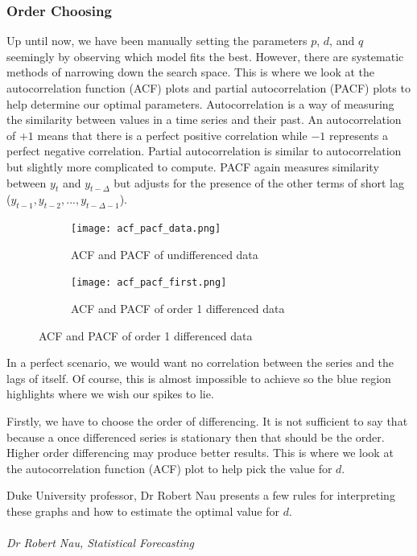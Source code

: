 \documentclass{article}
\begin{document}
  \subsubsection{Order Choosing}
  Up until now, we have been manually setting the parameters $p$, $d$, and $q$ seemingly by observing which model fits the best. However, there are systematic methods of narrowing down the search space. This is where we look at the autocorrelation function (ACF) plots and partial autocorrelation (PACF) plots to help determine our optimal parameters. Autocorrelation is a way of measuring the similarity between values in a time series and their past. An autocorrelation of $+1$ means that there is a perfect positive correlation while $-1$ represents a perfect negative correlation. Partial autocorrelation is similar to autocorrelation but slightly more complicated to compute. PACF again measures similarity between $y_t$ and $y_{t-\Delta}$ but adjusts for the presence of the other terms of short lag ($y_{t-1}, y_{t-2},...,y_{t-\Delta-1}$).

  \begin{figure}[H]
    \centering
    \captionsetup{justification=centering}
    \begin{subfigure}[b]{\linewidth}
      \texttt{[image: acf\_pacf\_data.png]}
      \caption{ACF and PACF of undifferenced data}
    \end{subfigure}
    \begin{subfigure}[b]{\linewidth}
      \texttt{[image: acf\_pacf\_first.png]}
      \caption{ACF and PACF of order 1 differenced data}
    \end{subfigure}
  \end{figure}
  

  In a perfect scenario, we would want no correlation between the series and the lags of itself. Of course, this is almost impossible to achieve so the blue region highlights where we wish our spikes to lie. 

  Firstly, we have to choose the order of differencing. It is not sufficient to say that because a once differenced series is stationary then that should be the order. Higher order differencing may produce better results. This is where we look at the autocorrelation function (ACF) plot to help pick the value for $d$. 

  Duke University professor, Dr Robert Nau presents a few rules for interpreting these graphs and how to estimate the optimal value for $d$.
  \newline
  \newline
  \emph{\\
  \\
  Dr Robert Nau, Statistical Forecasting}
  \newline
\end{document}
